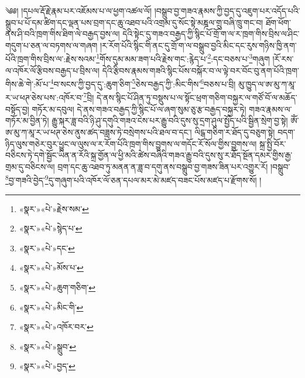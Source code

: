 ༄༅། །དཔལ་རྡོ་རྗེ་རྣམ་པར་འཇོམས་པ་ལ་ཕྱག་འཚལ་ལོ། །བསྒྲུབ་བྱ་གཟའ་རྣམས་ཀྱི་བྱད་དུ་འཇུག་པར་འདོད་པའི་སྒྲུབ་པ་པོ་དམ་ཚིག་དང་ལྡན་པས་བྲག་དང་ཆུ་འཐབ་པའི་འགྲམ་དུ་སོང་སྟེ་མཎྜལ་གྲུ་བཞི་ཁྲུ་གང་བ། ཐོག་ཕོག་ནས་ཤི་བའི་ཁྲག་གིས་ཐིག་ལེ་བརྒྱད་བྱས་ལ། དེའི་སྟེང་དུ་གཟའ་བརྒྱད་ཀྱི་སྙིང་པོ་གྲོ་ག་ལ་ར་ཁྲག་གིས་བྲིས་ལ་ཤིང་གདུག་པ་ཅན་ལ་བཏགས་ལ་གཞག །ར་རོག་པོའི་སྙིང་གི་ནང་དུ་གྲོ་ག་ལ་བསྒྲུབ་བྱའི་མིང་དང་རུས་གཉིས་ཁྱི་ནག་པོའི་ཁྲག་གིས་བྲིས་ལ་:རྗེས་སའམ་\footnote{«སྣར་»«པེ་»རྗེས་སམ་}གོས་དུམ་མམ་ཟག་པའི་རྗེས་གང་:རྙེད་པ་\footnote{«སྣར་»«པེ་»སྙེད་པ་}:དང་བཅས་པ་\footnote{«སྣར་»«པེ་»དང་}གཞུག །རོ་རས་ལ་འཁོར་ལོ་རྩིབས་བརྒྱད་པ་བྲིས་ལ། དེའི་རྩིབས་རྣམས་གཟའི་སྙིང་པོས་བསྐོར་བ་ལ་ལྟེ་བར་བོང་བུ་ནག་པོའི་ཁྲག་གིས་ཆེ་གེ་:མོ་པ་\footnote{«སྣར་»«པེ་»མོས་པ་}བ་སངས་ཀྱི་བྱད་དུ་:ཆུག་ཅིག་\footnote{«སྣར་»«པེ་»ཆུག་གཅིག་}ཅེས་བརྒྱད་ཀྱི་:མིང་གིས་\footnote{«སྣར་»«པེ་»མིང་གི་}བཅས་པ་བྲི། མུ་ཁྱུད་ལ་ཨ་མུ་ཀ་མཱ་ར་ཡ་ཕཊ་ཅེས་པས་:འཁོར་བ་\footnote{«སྣར་»«པེ་»འཁོར་བར་}བྲི། དེ་ནས་སྙིང་པོ་ཤིན་ཏུ་བསྡུས་པ་ལ་སྟོང་ཕྲག་གཅིག་བསྐྱར་ལ་གཙོ་བོ་ལ་མཆོད་བསྟོད་བྱ། གཏོར་མ་དབུལ། དེ་ནས་གཟའ་བརྒྱད་ཀྱི་སྙིང་པོ་ལ་ཞག་སུམ་ཅུ་རྩ་བརྒྱད་བསྐྱར་ཏེ། གཟའ་རྣམས་ལ་གཏོར་མ་བྱིན་ཏེ། རྒྱུ་སྐར་ཟླ་བའི་ཉི་ཤུ་དགུའི་གཟའ་ངེས་པར་རྒྱུ་བའི་དུས་སུ་དྲག་ཤུལ་སྤྱོད་པའི་སྦྱིན་སྲེག་བྱ་སྟེ། ཨོཾ་ཨ་མུ་ཀ་མཱ་ར་ཡ་ཕཊ་ཅེས་ནུས་ཚད་བཟླས་ཏེ་བསྲེགས་པའི་ཐལ་བ་དང་། ལིངྒ་གཅིག་ར་ཐོད་དུ་བཅུག་སྟེ། བདག་ཉིད་ལུས་གཅེར་བུར་ཕྱུང་ལ་ལུས་ལ་ར་རོག་པོའི་ཁྲག་གིས་བྱུགས་ལ་གདོང་རོ་སོལ་གྱིས་བྱུགས་ལ། སྐྲ་སྤྱི་བོར་བཅིངས་ཏེ་དགེ་སྦྱོང་ཡིན་ན་རོའི་སྐྲ་གྱོན་ལ་ཕྱི་མའི་ཚེས་བཞིའི་གཟའ་རྒྱུ་བའི་དུས་སུ་ར་ཐོད་སྔོན་དམར་གྱིས་རྒྱ་གྲམ་དུ་བཅིངས་ལ། བྲག་དང་ཆུ་འཐབ་ཏུ་མནན་ན་ཟླ་བ་དགུ་ནས་བསྒྲུབ་བྱ་གཟས་ཟིན་པར་འགྱུར་རོ། །བསྒྲུབ་\footnote{«སྣར་»«པེ་»སྒྲུབ་}བྱ་གཟའི་བྱེད་\footnote{«སྣར་»«པེ་»བྱད་}དུ་གཞུག་པའི་འཁོར་ལོ་ཅན་དཔལ་མར་མེ་མཛད་བཟང་པོས་མཛད་པ་རྫོགས་སོ། ། 